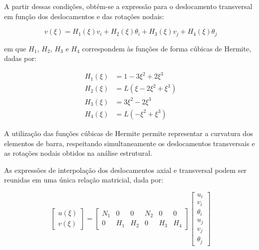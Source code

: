 A partir dessas condições, obtém-se a expressão para o deslocamento transversal em função dos deslocamentos e das rotações nodais:

\begin{equation}
    v(\xi) =
    H_1(\xi)v_i +
    H_2(\xi)\theta_i +
    H_3(\xi)v_j +
    H_4(\xi)\theta_j
    \label{eq:deformada_interpolacao_transversal}
\end{equation}
 
em que $H_1$, $H_2$, $H_3$ e $H_4$ correspondem às funções de forma cúbicas de Hermite, dadas por:

\begin{equation}
    \begin{aligned}
        H_1(\xi) &= 1-3\xi^2+2\xi^3 \\
        H_2(\xi) &= L(\xi-2\xi^2+\xi^3) \\
        H_3(\xi) &= 3\xi^2-2\xi^3 \\
        H_4(\xi) &= L(-\xi^2+\xi^3)
    \end{aligned}
    \label{eq:deformada_funcoes_hermite}
\end{equation}

A utilização das funções cúbicas de Hermite permite representar a curvatura dos elementos de barra, respeitando simultaneamente os deslocamentos transversais e as rotações nodais obtidos na análise estrutural.

As expressões de interpolação dos deslocamentos axial e transversal podem ser reunidas em uma única relação matricial, dada por:

\begin{equation}
    \begin{bmatrix}
        u(\xi) \\
        v(\xi)
    \end{bmatrix}
    =
    \begin{bmatrix}
        N_1 & 0   & 0   & N_2 & 0   & 0   \\
        0   & H_1 & H_2 & 0   & H_3 & H_4
    \end{bmatrix}
    \begin{bmatrix}
        u_i \\
        v_i \\
        \theta_i \\
        u_j \\
        v_j \\
        \theta_j
    \end{bmatrix}
    \label{eq:deformada_interpolacao_matricial}
\end{equation}

